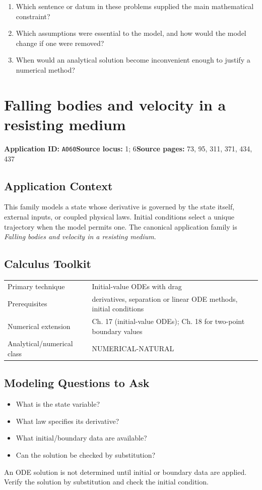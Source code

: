 \documentclass[11pt]{book}
\newcommand{\pid}[1]{\texttt{#1}}
\begin{document}
\begin{reflectionbox}\begin{enumerate}
\item Which sentence or datum in these problems supplied the main mathematical constraint?
\item Which assumptions were essential to the model, and how would the model change if one were removed?
\item When would an analytical solution become inconvenient enough to justify a numerical method?
\end{enumerate}\end{reflectionbox}
\chapter{Falling bodies and velocity in a resisting medium}\label{app:A060}
\textbf{Application ID:} \pid{A060}\quad \textbf{Source locus:} 1; 6\quad \textbf{Source pages:} 73, 95, 311, 371, 434, 437
\section*{Application Context}
This family models a state whose derivative is governed by the state itself, external inputs, or coupled physical laws. Initial conditions select a unique trajectory when the model permits one. The canonical application family is \emph{Falling bodies and velocity in a resisting medium}.
\section*{Calculus Toolkit}
\begin{tabularx}{\textwidth}{@{}lX@{}}\toprule
Primary technique & Initial-value ODEs with drag \\
Prerequisites & derivatives, separation or linear ODE methods, initial conditions \\
Numerical extension & Ch. 17 (initial-value ODEs); Ch. 18 for two-point boundary values \\
Analytical/numerical class & NUMERICAL-NATURAL \\
\bottomrule\end{tabularx}
\section*{Modeling Questions to Ask}\begin{itemize}
\item What is the state variable?
\item What law specifies its derivative?
\item What initial/boundary data are available?
\item Can the solution be checked by substitution?
\end{itemize}
\begin{errorbox}An ODE solution is not determined until initial or boundary data are applied. Verify the solution by substitution and check the initial condition.\end{errorbox}
\end{document}
